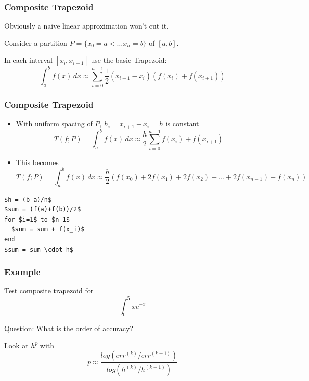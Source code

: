 \documentclass[10pt]{beamer}
\begin{document}
\begin{frame}
\frametitle{Composite Trapezoid}
Obviously a naive linear approximation won't cut it.
\bigskip

Consider a partition $P=\{x_0=a< \dots x_n = b\}$ of $[a,b]$.
\bigskip

In each interval $[x_i,x_{i+1}]$ use the basic Trapezoid:
\begin{equation*}
  \int_a^b f(x)\,dx \approx \sum_{i=0}^{n-1}
\frac{1}{2}(x_{i+1}-x_{i})(f(x_i)+f(x_{i+1}))
\end{equation*}

\begin{center}
\qquad
\end{center}

\end{frame}
\begin{frame}[fragile]
\frametitle{Composite Trapezoid}
\begin{itemize}
  \item With uniform spacing of $P$, $h_i=x_{i+1}-x_{i}=h$ is constant
\begin{equation*}
T(f;P) = \int_a^b f(x)\,dx \approx \frac{h}{2}\sum_{i=0}^{n-1}f(x_i)+f(x_{i+1})
\end{equation*}
  \item This becomes
\begin{equation*}
T(f;P) = \int_a^b f(x)\,dx \approx \frac{h}{2}\left(f(x_0) + 2 f(x_1) +
2f(x_2) + \dots + 2 f(x_{n-1}) + f(x_n)\right)
\end{equation*}
\end{itemize}
\begin{lstlisting}[mathescape]
$h = (b-a)/n$
$sum = (f(a)+f(b))/2$
for $i=1$ to $n-1$
  $sum = sum + f(x_i)$
end
$sum = sum \cdot h$
\end{lstlisting}
\end{frame}
\begin{frame}
\frametitle{Example}
Test composite trapezoid for
\begin{equation*}
  \int_0^5 x e^{-x}
\end{equation*}

Question: What is the order of accuracy?
\bigskip

Look at $h^p$ with
\begin{equation*}
  p \approx \frac{log(err^{(k)}/err^{(k-1)})}{log(h^{(k)}/h^{(k-1)})}
\end{equation*}
\end{frame}
\end{document}
